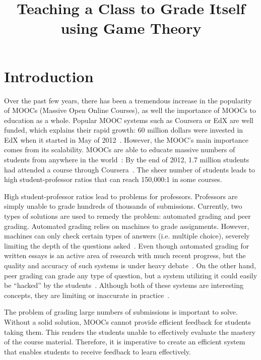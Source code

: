 \documentclass[12pt, Arial]{article}
\title{Teaching a Class to Grade Itself using Game Theory}
\author{}%
\date{}
\begin{document}
\maketitle
\section{Introduction}
Over the past few years, there has been a tremendous increase in the popularity of MOOCs (Massive Open Online Courses), as well the importance of MOOCs to education as a whole. Popular MOOC systems such as Coursera or EdX are well funded, which explains their rapid growth: 60 million dollars were invested in EdX when it started in May of 2012~\cite{canmoocsreducecc}. However, the MOOC's main importance comes from its scalability. MOOCs are able to educate massive numbers of students from anywhere in the world~\cite{makingsenseofmoocs}: By the end of 2012, 1.7 million students had attended a course through Coursera~\cite{swotanalysisofmoocs}. The sheer number of students leads to high student-professor ratios that can reach 150,000:1 in some courses.

High student-professor ratios lead to problems for professors. Professors are simply unable to grade hundreds of thousands of submissions. Currently, two types of solutions are used to remedy the problem: automated grading and peer grading. Automated grading relies on machines to grade assignments. However, machines can only check certain types of answers (i.e. multiple choice), severely limiting the depth of the questions asked~\cite{rightandwrongmoocs}. Even though automated grading for written essays is an active area of research with much recent progress, but the quality and accuracy of such systems is under heavy debate~\cite{automatedsystemssuck}. On the other hand, peer grading can grade any type of question, but a system utilizing it could easily be ``hacked'' by the students~\cite{makingsenseofmoocs}. Although both of these systems are interesting concepts, they are limiting or inaccurate in practice~\cite{howaccurateispeergrading}.

The problem of grading large numbers of submissions is important to solve. Without a solid solution, MOOCs cannot provide efficient feedback for students taking them. This renders the students unable to effectively evaluate the mastery of the course material. Therefore, it is imperative to create an efficient system that enables students to receive feedback to learn effectively.
\end{document}
